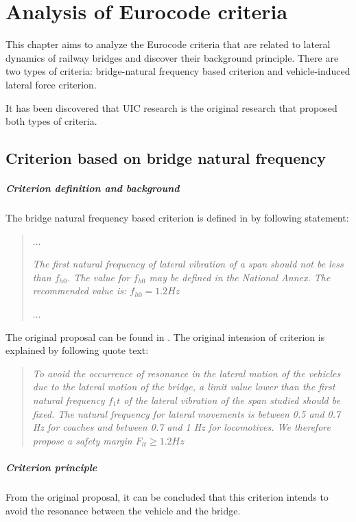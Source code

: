 
\chapter{Analysis of Eurocode criteria}

This chapter aims to analyze the Eurocode criteria that are related to lateral dynamics of railway bridges and discover their background principle. There are two types of criteria: bridge-natural frequency based criterion and vehicle-induced lateral force criterion. 

It has been discovered that UIC research\citep{d181} is the original research that proposed both types of criteria.

\section{Criterion based on bridge natural frequency}

\paragraph{Criterion definition and background}
The bridge natural frequency based criterion is defined in \citep[A24.4.2.4]{EC12} by following statement:

\begin{quote}
	...

	\emph{The first natural frequency of lateral vibration of a span should not be less than $f_{h0}$. The value for $f_{h0}$ may be defined in the National Annex. The recommended value is: $f_{h0}=1.2 Hz$}

	...
\end{quote}

The original proposal can be found in \citep[Proposed criteria]{d181}. The original intension of criterion is explained by following quote text:

\begin{quote}
	\emph{To avoid the occurrence of resonance in the lateral motion of the vehicles due to the lateral motion of the bridge, a limit value lower than the first natural frequency $f_1t$ of the lateral vibration of the span studied should be fixed. The natural frequency for lateral movements is between 0.5 and 0.7 Hz for coaches and between 0.7 and 1 Hz for locomotives. We therefore propose a safety margin $F_{lt} \geq 1.2Hz$}
\end{quote}

\paragraph{Criterion principle} From the original proposal, it can be concluded that this criterion intends to avoid the resonance between the vehicle and the bridge. 

